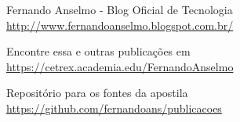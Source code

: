 	Fernando Anselmo - Blog Oficial de Tecnologia \\
	\url{http://www.fernandoanselmo.blogspot.com.br/}
	
	Encontre essa e outras publicações em \\
	\url{https://cetrex.academia.edu/FernandoAnselmo}
	
	Repositório para os fontes da apostila \\
	\url{https://github.com/fernandoans/publicacoes}